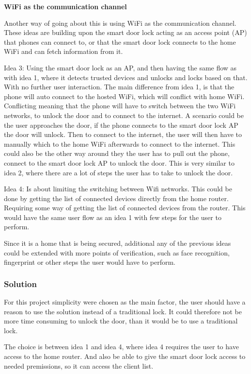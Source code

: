 \textbf{WiFi as the communication channel}

Another way of going about this is using WiFi as the communication channel.
These ideas are building upon the smart door lock acting as an access point (AP) that phones can connect to, or that the smart door lock connects to the home WiFi and can fetch information from it.

Idea 3: Using the smart door lock as an AP, and then having the same flow as with idea 1, where it detects trusted devices and unlocks and locks based on that. With no further user interaction.
The main difference from idea 1, is that the phone will auto connect to the hosted WiFi, which will conflict with home WiFi.
Conflicting meaning that the phone will have to switch between the two WiFi networks, to unlock the door and to connect to the internet.
A scenario could be the user approaches the door, if the phone connects to the smart door lock AP the door will unlock.
Then to connect to the internet, the user will then have to manually which to the home WiFi afterwards to connect to the internet.
This could also be the other way around they the user has to pull out the phone, connect to the smart door lock AP to unlock the door.
This is very similar to idea 2, where there are a lot of steps the user has to take to unlock the door.

Idea 4: Is about limiting the switching between Wifi networks.
This could be done by getting the list of connected devices directly from the home router.
Requiring some way of getting the list of connected devices from the router.
This would have the same user flow as an idea 1 with few steps for the user to perform.

Since it is a home that is being secured, additional any of the previous ideas could be extended with more points of verification, such as face recognition, fingerprint or other steps the user would have to perform.

\subsubsection{Solution}
For this project simplicity were chosen as the main factor, the user should have a reason to use the solution instead of a traditional lock.
It could therefore not be more time consuming to unlock the door, than it would be to use a traditional lock.

The choice is between idea 1 and idea 4, where idea 4 requires the user to have access to the home router.
And also be able to give the smart door lock access to needed premissions, so it can access the client list.

